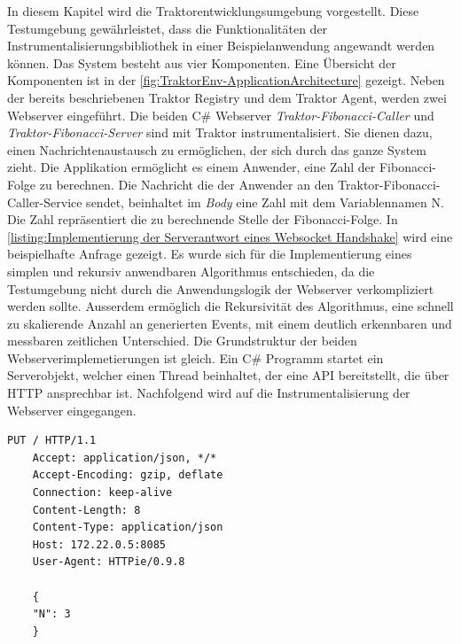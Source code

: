 In diesem Kapitel wird die Traktorentwicklungsumgebung vorgestellt. Diese Testumgebung gewährleistet, dass die Funktionalitäten der Instrumentalisierungsbibliothek in einer Beispielanwendung angewandt werden können. Das System besteht aus vier Komponenten. Eine Übersicht der Komponenten ist in der \cref{fig:TraktorEnv-ApplicationArchitecture} gezeigt. Neben der bereits beschriebenen Traktor Registry und dem Traktor Agent, werden zwei Webserver eingeführt. Die beiden C\# Webserver \emph{Traktor-Fibonacci-Caller} und \emph{Traktor-Fibonacci-Server} sind mit Traktor instrumentalisiert. Sie dienen dazu, einen Nachrichtenaustausch zu ermöglichen, der sich durch das ganze System zieht. Die Applikation ermöglicht es einem Anwender, eine Zahl der Fibonacci-Folge zu berechnen. Die Nachricht die der Anwender an den Traktor-Fibonacci-Caller-Service sendet, beinhaltet im \emph{Body} eine Zahl mit dem Variablennamen N. Die Zahl repräsentiert die zu berechnende Stelle der Fibonacci-Folge. In \cref{listing:Implementierung der Serverantwort eines Websocket Handshake} wird eine beispielhafte Anfrage gezeigt. Es wurde sich für die Implementierung eines simplen und rekursiv anwendbaren Algorithmus entschieden, da die Testumgebung nicht durch die Anwendungslogik der Webserver verkompliziert werden sollte. Ausserdem ermöglich die Rekursivität des Algorithmus, eine schnell zu skalierende Anzahl an generierten Events, mit einem deutlich erkennbaren und messbaren zeitlichen Unterschied. Die Grundstruktur der beiden Webserverimplemetierungen ist gleich. Ein C\# Programm startet ein Serverobjekt, welcher einen Thread beinhaltet, der eine API bereitstellt, die über HTTP ansprechbar ist. Nachfolgend wird auf die Instrumentalisierung der Webserver eingegangen.

\begin{minipage}[]{\textwidth}
	\begin{lstlisting}[frame=trBL]
	PUT / HTTP/1.1
	Accept: application/json, */*
	Accept-Encoding: gzip, deflate
	Connection: keep-alive
	Content-Length: 8
	Content-Type: application/json
	Host: 172.22.0.5:8085
	User-Agent: HTTPie/0.9.8
	
	{
	"N": 3
	}
	\end{lstlisting}
	\label{listing:Implementierung der Serverantwort eines Websocket Handshake}
\end{minipage}


